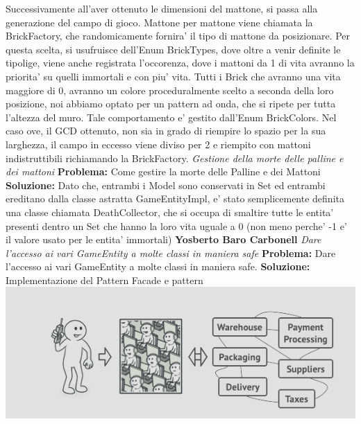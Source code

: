 \documentclass[a4paper,12pt]{report}
\begin{document}
Successivamente all'aver ottenuto le dimensioni del mattone, si passa alla generazione del campo di gioco. Mattone per mattone viene chiamata la BrickFactory, che randomicamente fornira' il tipo di mattone da posizionare. Per questa scelta, si usufruisce dell'Enum BrickTypes, dove oltre a venir  definite le tipolige, viene anche registrata l'occorenza, dove i mattoni da 1 di vita avranno la priorita' su quelli immortali e con piu' vita. \newline
Tutti i Brick che avranno una vita maggiore di 0, avranno un colore proceduralmente scelto a seconda della loro posizione, noi abbiamo optato per un pattern ad onda, che si ripete per tutta l'altezza del muro. Tale comportamento e' gestito dall'Enum BrickColors.\newline
Nel caso ove, il GCD ottenuto, non sia in grado di riempire lo spazio per la sua larghezza, il campo in eccesso viene diviso per 2 e riempito con mattoni indistruttibili richiamando la BrickFactory.\newline
\newline
\textit{Gestione della morte delle palline e dei mattoni}
\newline
\newline
\textbf{Problema:} Come gestire la morte delle Palline e dei Mattoni
\newline
\newline
\textbf{Soluzione:} Dato che, entrambi i Model sono conservati in Set ed entrambi ereditano dalla classe astratta GameEntityImpl, e' stato semplicemente definita una classe chiamata DeathCollector, che si occupa di smaltire tutte le entita' presenti dentro un Set che hanno la loro vita uguale a 0 (non meno perche' -1 e' il valore usato per le entita' immortali)
\newline
\newline
\newline
\newline
\textbf{Yosberto Baro Carbonell}
\newline
\newline
\textit{Dare l’accesso ai vari GameEntity a molte classi in maniera safe}
\newline
\newline
\textbf{Problema:} Dare l’accesso ai vari GameEntity a molte classi in maniera safe.\newline
\textbf{Soluzione:} Implementazione del Pattern Facade e pattern \newline
\includegraphics[width=\textwidth]{facadeExample.png}
\end{document}
